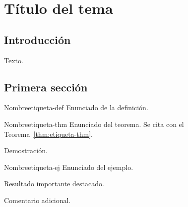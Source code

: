 %      
\chapter{Título del tema}
\label{cap:nombre-del-tema}

\section{Introducción}

Texto.

\section{Primera sección}

\begin{definicion}{Nombre}{etiqueta-def}
Enunciado de la definición.
\end{definicion}

\begin{teorema}{Nombre}{etiqueta-thm}
Enunciado del teorema. Se cita con el Teorema~\ref{thm:etiqueta-thm}.
\end{teorema}

\begin{demostracion}
Demostración.
\end{demostracion}

\begin{ejemplo}{Nombre}{etiqueta-ej}
Enunciado del ejemplo.
\end{ejemplo}

\begin{resultado}
Resultado importante destacado.
\end{resultado}

\begin{observacion}
Comentario adicional.
\end{observacion}
